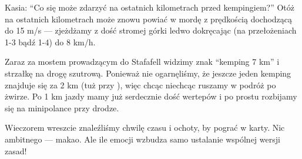 Kasia: “Co się może zdarzyć na ostatnich kilometrach przed kempingiem?” Otóż na ostatnich kilometrach może znowu powiać w mordę z prędkością dochodzącą do 15 m/s --- zjeżdżamy z dość stromej górki ledwo dokręcając (na przełożeniach 1-3 bądź 1-4) do 8 km/h.

Zaraz za mostem prowadzącym do Stafafell widzimy znak “kemping 7 km” i strzałkę na drogę szutrową. Ponieważ nie ogarnęliśmy, że jeszcze jeden kemping znajduje się za 2 km (tuż przy ), więc chcąc niechcąc ruszamy w podróż po żwirze. Po 1 km jazdy mamy już serdecznie dość wertepów i po prostu rozbijamy się na minipolance przy drodze.

Wieczorem wreszcie znaleźliśmy chwilę czasu i ochoty, by pograć w karty. Nic ambitnego --- makao. Ale ile emocji wzbudza samo ustalanie wspólnej wersji zasad!

